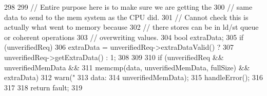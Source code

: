 \begin{DoxyCode}
{298 
299    // Entire purpose here is to make sure we are getting the
300    // same data to send to the mem system as the CPU did.
301    // Cannot check this is actually what went to memory because
302    // there stores can be in ld/st queue or coherent operations
303    // overwriting values.
304    bool extraData;
305    if (unverifiedReq) {
306        extraData = unverifiedReq->extraDataValid() ?
307                         unverifiedReq->getExtraData() : 1;
308    }
309 
310    if (unverifiedReq && unverifiedMemData &&
311        memcmp(data, unverifiedMemData, fullSize) && extraData) {
312            warn("%
313                   data: %
314                   unverifiedMemData);
315        handleError();
316    }
317 
318    return fault;
319 }
\end{DoxyCode}


